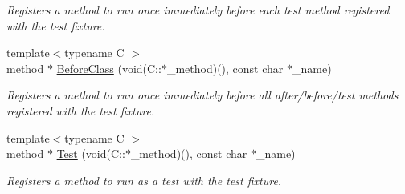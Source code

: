 \begin{DoxyCompactItemize}
\begin{DoxyCompactList}\small\item\em Registers a method to run once immediately before each test method registered with the test fixture. \end{DoxyCompactList}\item 
{\footnotesize template$<$typename C $>$ }\\method $\ast$ \mbox{\hyperlink{classtpunit_1_1TestFixture_a5de4bd9771ef8db0157b0748ab2d7cd2}{Before\+Class}} (void(C\+::$\ast$\+\_\+method)(), const char $\ast$\+\_\+name)
\begin{DoxyCompactList}\small\item\em Registers a method to run once immediately before all after/before/test methods registered with the test fixture. \end{DoxyCompactList}\item 
{\footnotesize template$<$typename C $>$ }\\method $\ast$ \mbox{\hyperlink{classtpunit_1_1TestFixture_a1068f872071792580ea4013033bfca10}{Test}} (void(C\+::$\ast$\+\_\+method)(), const char $\ast$\+\_\+name)
\begin{DoxyCompactList}\small\item\em Registers a method to run as a test with the test fixture. \end{DoxyCompactList}\end{DoxyCompactItemize}
